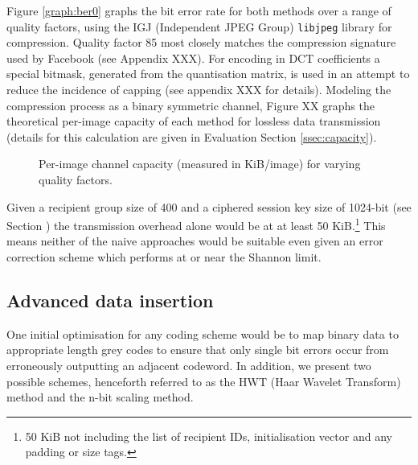 Figure \ref{graph:ber0} graphs the bit error rate for both methods over a range of quality factors, using the IGJ (Independent JPEG Group) {\tt libjpeg} library for compression. Quality factor 85 most closely matches the compression signature used by Facebook (see Appendix XXX). For encoding in DCT coefficients a special bitmask, generated from the quantisation matrix, is used in an attempt to reduce the incidence of capping (see appendix XXX for details). Modeling the compression process as a binary symmetric channel, Figure XX graphs the theoretical per-image capacity of each method for lossless data transmission (details for this calculation are given in Evaluation Section \ref{ssec:capacity}).


\begin{figure}[tbph]
  \begin{center}
    \caption{Per-image channel capacity (measured in KiB/image) for varying quality factors.}
    \label{graph:capacity0}
  \end{center}
\end{figure}

Given a recipient group size of 400 and a ciphered session key size of 1024-bit (see Section \label{ssec:keys}) the transmission overhead alone would be at at least 50 KiB.\footnote{50 KiB not including the list of recipient IDs, initialisation vector and any padding or size tags.} This means neither of the naive approaches would be suitable even given an error correction scheme which performs at or near the Shannon limit. 


\subsection{Advanced data insertion}

One initial optimisation for any coding scheme would be to map binary data to appropriate length grey codes to ensure that only single bit errors occur from erroneously outputting an adjacent codeword. In addition, we present two possible schemes, henceforth referred to as the HWT (Haar Wavelet Transform) method and the n-bit scaling method.

